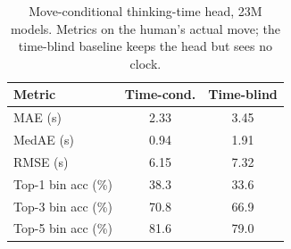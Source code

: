 \begin{table}[t]
\caption{Move-conditional thinking-time head, 23M models. Metrics on the human's
actual move; the time-blind baseline keeps the head but sees no clock.}
\label{tab:timehead}
\centering
\renewcommand{\arraystretch}{1.2}
\begin{tabular}{lcc}
\hline
\textbf{Metric} & \textbf{Time-cond.} & \textbf{Time-blind} \\
\hline
MAE (s)            & 2.33 & 3.45 \\
MedAE (s)          & 0.94 & 1.91 \\
RMSE (s)           & 6.15 & 7.32 \\
Top-1 bin acc (\%) & 38.3 & 33.6 \\
Top-3 bin acc (\%) & 70.8 & 66.9 \\
Top-5 bin acc (\%) & 81.6 & 79.0 \\
\hline
\end{tabular}
\end{table}
